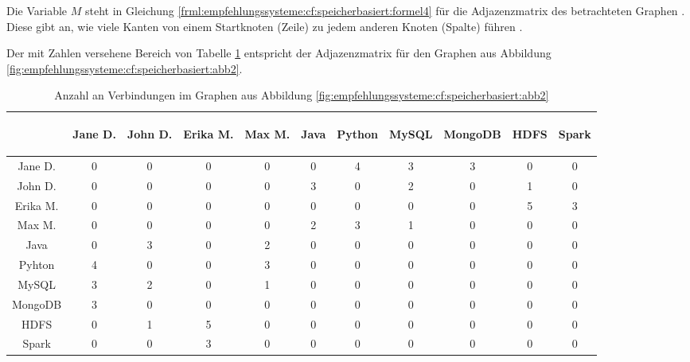 Die Variable $M$ steht in Gleichung \ref{frml:empfehlungssysteme:cf:speicherbasiert:formel4} für die Adjazenzmatrix des betrachteten Graphen \cite[S. 4]{libenNowell:2007}. Diese gibt an, wie viele Kanten von einem Startknoten (Zeile) zu jedem anderen Knoten (Spalte) führen \cite[S. 6]{guns:2014}.

Der mit Zahlen versehene Bereich von Tabelle \ref{tbl:empfehlungssysteme:arbeitsweise:tbl2} entspricht der Adjazenzmatrix für den Graphen aus Abbildung \ref{fig:empfehlungssysteme:cf:speicherbasiert:abb2}.

\begin{table}[h]
	\centering
	\begin{tabular}{c|c|c|c|c|c|c|c|c|c|c}
		& \begin{sideways}Jane D.\end{sideways} & \begin{sideways}John D.\end{sideways} & \begin{sideways}Erika M.\end{sideways} & \begin{sideways}Max M.\end{sideways} & \begin{sideways}Java\end{sideways} & \begin{sideways}Python\end{sideways} & \begin{sideways}MySQL\end{sideways} & \begin{sideways}MongoDB\end{sideways} & \begin{sideways}HDFS\end{sideways} & \begin{sideways}Spark\end{sideways} \\
		\hline
		Jane D.  & 0 & 0 & 0 & 0 & 0 & 4 & 3 & 3 & 0 & 0\\
		John D.  & 0 & 0 & 0 & 0 & 3 & 0 & 2 & 0 & 1 & 0\\
		Erika M. & 0 & 0 & 0 & 0 & 0 & 0 & 0 & 0 & 5 & 3\\
		Max M.   & 0 & 0 & 0 & 0 & 2 & 3 & 1 & 0 & 0 & 0\\
		Java     & 0 & 3 & 0 & 2 & 0 & 0 & 0 & 0 & 0 & 0\\
		Pyhton   & 4 & 0 & 0 & 3 & 0 & 0 & 0 & 0 & 0 & 0\\
		MySQL    & 3 & 2 & 0 & 1 & 0 & 0 & 0 & 0 & 0 & 0\\
		MongoDB  & 3 & 0 & 0 & 0 & 0 & 0 & 0 & 0 & 0 & 0\\
		HDFS     & 0 & 1 & 5 & 0 & 0 & 0 & 0 & 0 & 0 & 0\\
		Spark    & 0 & 0 & 3 & 0 & 0 & 0 & 0 & 0 & 0 & 0
	\end{tabular}
	\caption{Anzahl an Verbindungen im Graphen aus Abbildung \ref{fig:empfehlungssysteme:cf:speicherbasiert:abb2}}
	\label{tbl:empfehlungssysteme:arbeitsweise:tbl2}
\end{table}

